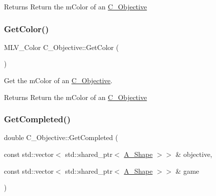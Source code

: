\begin{DoxyReturn}{Returns}
Return the m\+Color of an \hyperlink{classC__Objective}{C\+\_\+\+Objective} 
\end{DoxyReturn}
\mbox{\label{classC__Objective_aeaaa69ca15b1e1d8edbc3f1920399964}} 
\subsubsection{\texorpdfstring{Get\+Color()}{GetColor()}\hspace{0.1cm}{\footnotesize\ttfamily [2/2]}}
{\footnotesize\ttfamily M\+L\+V\+\_\+\+Color C\+\_\+\+Objective\+::\+Get\+Color (\begin{DoxyParamCaption}{ }\end{DoxyParamCaption})}



Get the m\+Color of an \hyperlink{classC__Objective}{C\+\_\+\+Objective}. 

\begin{DoxyReturn}{Returns}
Return the m\+Color of an \hyperlink{classC__Objective}{C\+\_\+\+Objective} 
\end{DoxyReturn}
\mbox{\label{classC__Objective_a026149982f0d62ea0a039a8b94bbaae0}} 
\subsubsection{\texorpdfstring{Get\+Completed()}{GetCompleted()}\hspace{0.1cm}{\footnotesize\ttfamily [1/2]}}
{\footnotesize\ttfamily double C\+\_\+\+Objective\+::\+Get\+Completed (\begin{DoxyParamCaption}\item[{const std\+::vector$<$ std\+::shared\+\_\+ptr$<$ \hyperlink{classA__Shape}{A\+\_\+\+Shape} $>$$>$ \&}]{objective,  }\item[{const std\+::vector$<$ std\+::shared\+\_\+ptr$<$ \hyperlink{classA__Shape}{A\+\_\+\+Shape} $>$$>$ \&}]{game }\end{DoxyParamCaption})}

\mbox{\label{classC__Objective_a026149982f0d62ea0a039a8b94bbaae0}} 

